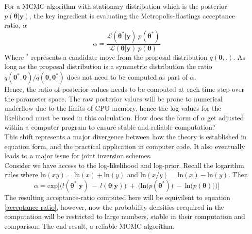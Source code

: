 For a MCMC algorithm with stationary distribution which is the posterior $p(\bm{\theta}|\bm{y})$, the key ingredient is evaluating the Metropolis-Hastings acceptance ratio, $\alpha$
\begin{equation}
\alpha = \frac{\mathcal{L}(\bm{\theta^*}|\bm{y})\ p(\bm{\theta^*})}{\mathcal{L}(\bm{\theta}|\bm{y})\ p(\bm{\theta})}
\label{acceptance-ratio}
\end{equation}
Where $^*$ represents a candidate move from the proposal distribution $q(\bm{\theta},.)$. As long as the proposal distribution is a symmetric distribution the ratio $q(\bm{\theta^*},\bm{\theta})/q(\bm{\theta},\bm{\theta^*})$ does not need to be computed as part of $\alpha$.\\

Hence, the ratio of posterior values needs to be computed at each time step over the parameter space. The raw posterior values will be prone to numerical underflow due to the limits of CPU memory, hence the log values for the likelihood must be used in this calculation. How does the form of $\alpha$ get adjusted within a computer program to ensure stable and reliable computation?\\

This shift represents a major divergence between how the theory is established in equation form, and the practical application in computer code. It also eventually leads to a major issue for joint inversion schemes. \\

Consider we have access to the log-likelihood and log-prior. Recall the logarithm rules where $\text{ln}(xy) = \text{ln}(x)+\text{ln}(y)$ and $\text{ln}(x/y) = \text{ln}(x)-\text{ln}(y)$. Then
\begin{equation}
\alpha = \text{exp}\Big[\Big(l(\bm{\theta^*}|\bm{y})\ -\ l(\bm{\theta}|\bm{y})\Big)\ +\ \Big(\text{ln}\big(p(\bm{\theta^*})\big)\ -\ \text{ln}\big(p(\bm{\theta})\big)\Big)\Big]
\end{equation}
The resulting acceptance-ratio computed here will be equivilent to equation \ref{acceptance-ratio}, however, now the probability densities recquired in the computation will be restricted to large numbers, stable in their computation and comparison. The end result, a reliable MCMC algorithm.\\


